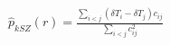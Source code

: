 \documentclass{standalone}
\begin{document}
$\hat p _{kSZ}(r)= \frac{\sum_{i<j}(\delta T_i - \delta T_j)c_{ij}}{\sum_{i<j}c_{ij}^2}$
\end{document}
